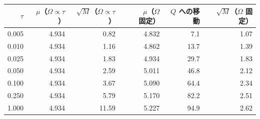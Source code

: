 \begin{tabular}{rrrrrr}
\toprule
$\tau$ & $\mu$（$\Omega\propto\tau$） & $\sqrt{M}$（$\Omega\propto\tau$） & $\mu$（$\Omega$ 固定） & $Q$ への移動 & $\sqrt{M}$（$\Omega$ 固定） \\
\midrule
0.005 & 4.934 & 0.82 & 4.832 & 7.1 & 1.07 \\
0.010 & 4.934 & 1.16 & 4.862 & 13.7 & 1.39 \\
0.025 & 4.934 & 1.83 & 4.934 & 29.7 & 1.83 \\
0.050 & 4.934 & 2.59 & 5.011 & 46.8 & 2.12 \\
0.100 & 4.934 & 3.67 & 5.090 & 64.4 & 2.34 \\
0.250 & 4.934 & 5.79 & 5.170 & 82.2 & 2.51 \\
1.000 & 4.934 & 11.59 & 5.227 & 94.9 & 2.62 \\
\bottomrule
\end{tabular}
